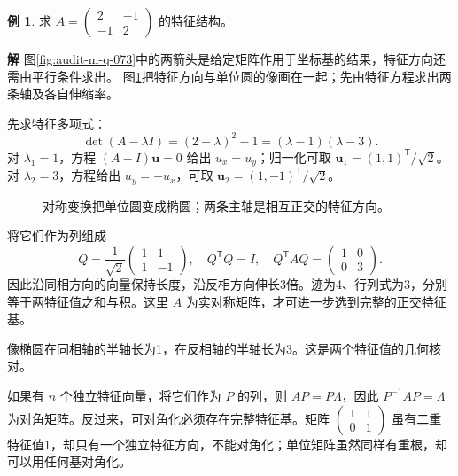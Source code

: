 \documentclass[11pt,openany,fontset=fandol]{ctexbook}
\theoremstyle{plain}\newtheorem{theorem}{定理}[chapter]\newtheorem{proposition}[theorem]{命题}
\theoremstyle{definition}\newtheorem{definition}{定义}[chapter]\newtheorem{example}{例}[chapter]
\theoremstyle{remark}\newtheorem*{remark}{说明}
\newcommand{\SolutionStart}{\par\nobreak\medskip\nobreak\noindent\textbf{解}\quad\ignorespaces}
\newenvironment{solution}{\SolutionStart}{\par\medskip}
\newcommand{\vct}[1]{\bm{#1}}\newcommand{\Rea}{\operatorname{Re}}\newcommand{\Ima}{\operatorname{Im}}
\begin{document}
\begin{example}
求 $A=\begin{pmatrix}2&-1\\-1&2\end{pmatrix}$ 的特征结构。
\end{example}

\begin{solution}
图\ref{fig:audit-m-q-073}中的两箭头是给定矩阵作用于坐标基的结果，特征方向还需由平行条件求出。
图\ref{fig:orig-062}把特征方向与单位圆的像画在一起；先由特征方程求出两条轴及各自伸缩率。

先求特征多项式：
\[
\det(A-\lambda I)=(2-\lambda)^2-1
=(\lambda-1)(\lambda-3).
\]
对 $\lambda_1=1$，方程 $(A-I)\vct u=0$ 给出 $u_x=u_y$；归一化可取 $\vct u_1=(1,1)^{\mathsf T}/\sqrt2$。对 $\lambda_2=3$，方程给出 $u_y=-u_x$，可取 $\vct u_2=(1,-1)^{\mathsf T}/\sqrt2$。

\begin{figure}[H]\centering
{}
\caption{对称变换把单位圆变成椭圆；两条主轴是相互正交的特征方向。}
\label{fig:orig-062}
\end{figure}

将它们作为列组成
\[
Q=\frac1{\sqrt2}\begin{pmatrix}1&1\\1&-1\end{pmatrix},
\quad Q^{\mathsf T}Q=I,
\quad Q^{\mathsf T}AQ=\begin{pmatrix}1&0\\0&3\end{pmatrix}.
\]
因此沿同相方向的向量保持长度，沿反相方向伸长3倍。迹为4、行列式为3，分别等于两特征值之和与积。这里 $A$ 为实对称矩阵，才可进一步选到完整的正交特征基。

像椭圆在同相轴的半轴长为1，在反相轴的半轴长为3。这是两个特征值的几何核对。
\end{solution}

如果有 $n$ 个独立特征向量，将它们作为 $P$ 的列，则 $AP=P\Lambda$，因此 $P^{-1}AP=\Lambda$ 为对角矩阵。反过来，可对角化必须存在完整特征基。矩阵 $\begin{pmatrix}1&1\\0&1\end{pmatrix}$ 虽有二重特征值1，却只有一个独立特征方向，不能对角化；单位矩阵虽然同样有重根，却可以用任何基对角化。
\end{document}
